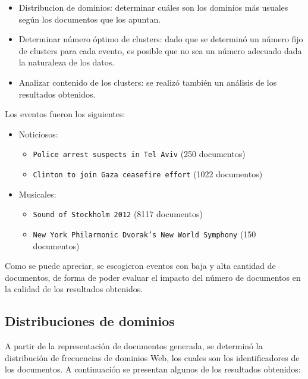 \begin{itemize}
\item Distribucion de dominios: determinar cuáles son los dominios más
    usuales según los documentos que los apuntan.
\item Determinar número óptimo de clusters: dado que se determinó un
    número fijo de clusters para cada evento, es posible que no sea un
    número adecuado dada la naturaleza de los datos.
\item Analizar contenido de los clusters: se realizó también un análisis
    de los resultados obtenidos.
\end{itemize}
  Los eventos fueron los siguientes:
\begin{itemize}
\item Noticiosos:

\begin{itemize}
\item \texttt{Police arrest suspects in Tel Aviv} (250 documentos)
\item \texttt{Clinton to join Gaza ceasefire effort} (1022 documentos)
\end{itemize}

\item Musicales:

\begin{itemize}
\item \texttt{Sound of Stockholm 2012} (8117 documentos)
\item \texttt{New York Philarmonic Dvorak's New World Symphony} (150
      documentos)
\end{itemize}

\end{itemize}
  Como se puede apreciar, se escogieron eventos con baja y alta
  cantidad de documentos, de forma de poder evaluar el impacto del
  número de documentos en la calidad de los resultados obtenidos.

\subsection{Distribuciones de dominios}
\label{sec-4.4.1}


    A partir de la representación de documentos generada, se determinó
    la distribución de frecuencias de dominios Web, los cuales son los
    identificadores de los documentos. A continuación se presentan
    algunos de los resultados obtenidos:

